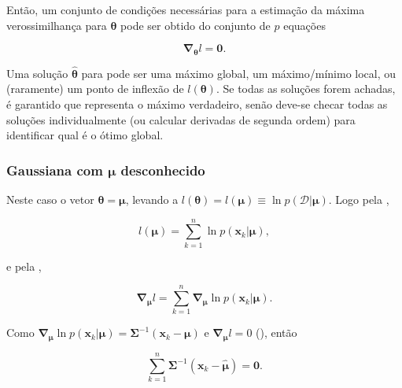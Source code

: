 Então, um conjunto de condições necessárias para a estimação da máxima verossimilhança para $\boldsymbol{\theta}$ pode ser obtido do conjunto de $p$ equações

\begin{equation}
    \boldsymbol{\nabla}_{\boldsymbol{\theta}} l = \boldsymbol{0}.
    \label{eq:gradient_theta_log_equal_zero}
\end{equation}

Uma solução $\boldsymbol{\hat{\theta}}$ para  pode ser uma máximo global, um máximo/mínimo local, ou (raramente) um ponto de inflexão de $l(\boldsymbol{\theta})$. Se todas as soluções forem achadas, é garantido que representa o máximo verdadeiro, senão deve-se checar todas as soluções individualmente (ou calcular derivadas de segunda ordem) para identificar qual é o ótimo global.

\subsubsection*{Gaussiana com $\boldsymbol{\mu}$ desconhecido}

Neste caso o vetor $\boldsymbol{\theta} = \boldsymbol{\mu}$, levando a $l(\boldsymbol{\theta}) = l(\boldsymbol{\mu}) \equiv \ln p(\mathcal{D}|\boldsymbol{\mu})$. Logo pela ,

\begin{equation}
    l(\boldsymbol{\mu}) = \sum_{k=1}^{n} \ln p(\boldsymbol{x}_k|\boldsymbol{\mu}),
    \label{eq:log_mu}
\end{equation}

\noindent e pela ,

\begin{equation}
    \boldsymbol{\nabla}_{\boldsymbol{\mu}} l = \sum_{k=1}^{n} \boldsymbol{\nabla}_{\boldsymbol{\mu}} \ln p(\boldsymbol{x}_k|\boldsymbol{\mu}).
    \label{eq:nabla_mu_log}
\end{equation}

\noindent Como $\boldsymbol{\nabla}_{\boldsymbol{\mu}} \ln p(\boldsymbol{x}_k|\boldsymbol{\mu}) = \boldsymbol{\Sigma}^{-1} (\boldsymbol{x}_k - \boldsymbol{\mu})$ e $\boldsymbol{\nabla}_{\boldsymbol{\mu}} l = 0$ (), então

\begin{equation}
    \sum_{k=1}^{n} \boldsymbol{\Sigma}^{-1} (\boldsymbol{x}_k - \boldsymbol{\hat{\mu}}) = \boldsymbol{0}.
    \label{eq:nabla_mu_log_equals_zero}
\end{equation}

